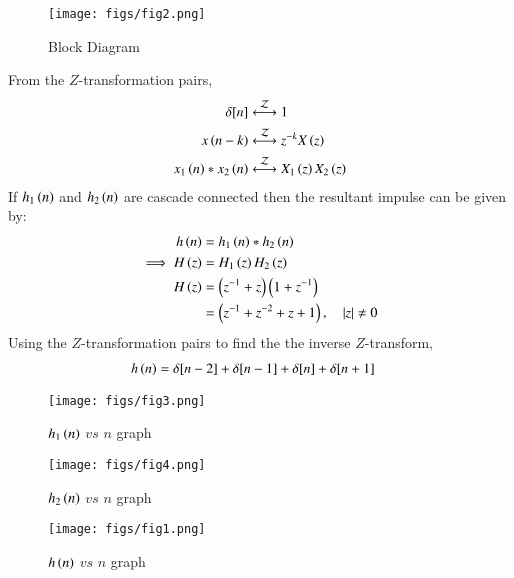 \documentclass[journal,12pt,twocolumn]{IEEEtran}
\theoremstyle{remark}
\begin{document}
\begin{figure}[ht]
    \centering
    \texttt{[image: figs/fig2.png]}
    \caption{Block Diagram}
    \label{fig:g2022ee7.2}
\end{figure}  
From the $Z$-transformation pairs,
\begin{align}
    \delta[n] &\overset{\mathcal{Z}}{ \longleftrightarrow} 1  \label{eqn:g22ee7.1}  \\
    x\left(n-k\right) &\overset{\mathcal{Z}}{ \longleftrightarrow} z^{-k}X\left(z\right) \label{eqn:g22ee7.2}   \\
    x_1\left(n\right)\ast x_2\left(n\right) &\overset{\mathcal{Z}}{ \longleftrightarrow} X_1\left(z\right)X_2\left(z\right) \label{eqn:g22ee7.3}
\end{align}
If $h_1\left(n\right)$ and $h_2\left(n\right)$ are cascade connected then the resultant impulse can be given by:
\begin{align}
    h\left(n\right)&=h_1\left(n\right)\ast h_2\left(n\right)    \\
    \implies H\left(z\right)&=H_1\left(z\right)H_2\left(z\right)    \\
    H\left(z\right)&=\left(z^{-1}+z\right)\left(1+z^{-1}\right)   \\
    &=\left(z^{-1}+z^{-2}+z+1\right), \quad \left\vert z\right\vert\neq 0
\end{align}
Using the $Z$-transformation pairs to find the the inverse $Z$-transform,
\begin{align}
    h\left(n\right)&=\delta[n-2]+\delta[n-1]+\delta[n]+\delta[n+1]
\end{align}
\begin{figure}[ht]
    \centering
    \texttt{[image: figs/fig3.png]}
    \caption{$h_1\left(n\right)$ $vs$ $n$ graph}
    \label{fig:g2022ee7.3}
\end{figure}     
\begin{figure}[ht]
    \centering
    \texttt{[image: figs/fig4.png]}
    \caption{$h_2\left(n\right)$ $vs$ $n$ graph}
    \label{fig:g2022ee7.4}
\end{figure}     
\begin{figure}[ht]
    \centering
    \texttt{[image: figs/fig1.png]}
    \caption{$h\left(n\right)$ $vs$ $n$ graph}
    \label{fig:g2022ee7.1}
\end{figure}
\end{document}
